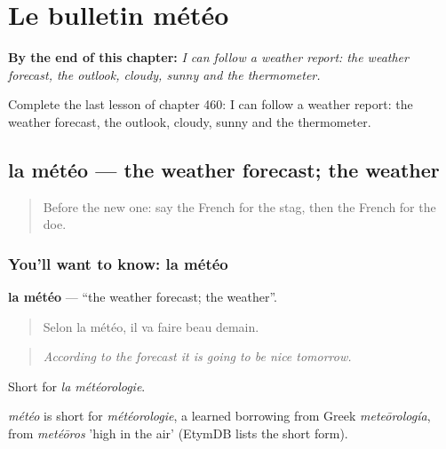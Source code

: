 
\chapter{Le bulletin météo}
\label{ch:fr-le-bulletin-meteo}

\begin{chapteropening}
\textbf{By the end of this chapter:} \emph{I can follow a weather report: the weather forecast, the outlook, cloudy, sunny and the thermometer.}

Complete the last lesson of chapter 460: I can follow a weather report: the weather forecast, the outlook, cloudy, sunny and the thermometer.
\end{chapteropening}

\section[la météo]{la météo — the weather forecast; the weather}

\label{lesson:FR-C460-meteo}



\begin{quote}
Before the new one: say the French for the stag, then the French for the doe.
\end{quote}

\subsection*{You'll want to know: la météo}
\textbf{la météo} — \textquotedblleft{}the weather forecast; the weather\textquotedblright{}.

\begin{quote}
Selon la météo, il va faire beau demain.
\end{quote}

\begin{quote}
\emph{According to the forecast it is going to be nice tomorrow.}
\end{quote}

Short for \emph{la météorologie}.

\begin{cousinweb}
\emph{météo} is short for \emph{météorologie}, a learned borrowing from Greek \emph{meteōrología}, from \emph{metéōros} 'high in the air' (EtymDB lists the short form).
\end{cousinweb}

